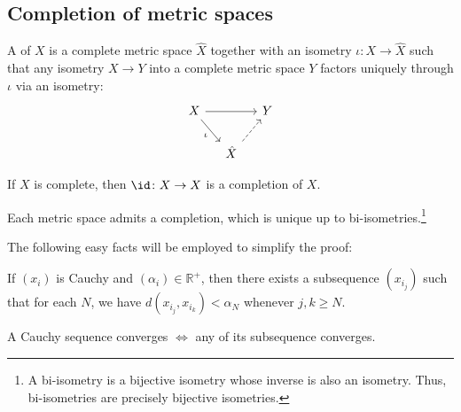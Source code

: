 \subsection{Completion of metric spaces}

	A  of $X$ is a complete metric space $\hat X$ together with an isometry $\iota\colon X\to \hat X$ such that any isometry $X\to Y$ into a complete metric space $Y$ factors uniquely through $\iota$ via an isometry:
	\[
	\begin{tikzcd}[column sep=small]
		X\ar[rr]\ar[dr, "\iota"'] & & Y\\
		& \hat X\ar[ur, dashed] & 
	\end{tikzcd}
	\]
	
	\begin{cor}
		If $X$ is complete, then $\id\colon X\to X$ is a completion of $X$.
	\end{cor}
	
	\begin{thm}\label{THM: completion of metric spaces}
		Each metric space admits a completion, which is unique up to bi-isometries.\footnote{
			A bi-isometry is a bijective isometry whose inverse is also an isometry. Thus, bi-isometries are precisely bijective isometries.
		}
	\end{thm}
	
	\noindent The following easy facts will be employed to simplify the proof:
	
	\begin{lem}\label{LEM: some properties of Cauchy sequences}
		\leavevmode
		\begin{mylist}
			\item If $(x_i)$ is Cauchy and $(\alpha_i)\in\mathbb R^+$, then there exists a subsequence $(x_{i_j})$ such that for each $N$, we have $d(x_{i_j}, x_{i_k}) < \alpha_N$ whenever $j, k\ge N$.
			
			\item A Cauchy sequence converges $\iff$ any of its subsequence converges.
		\end{mylist}
	\end{lem}
	
